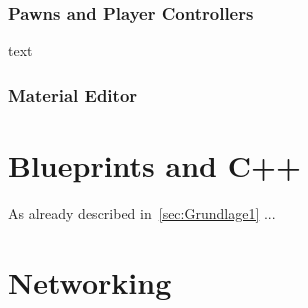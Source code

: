 \subsubsection{Pawns and Player Controllers}
text
\subsubsection{Material Editor}
\section{Blueprints and C++ }
As already described in~\ref{sec:Grundlage1} ...
\section{Networking}
